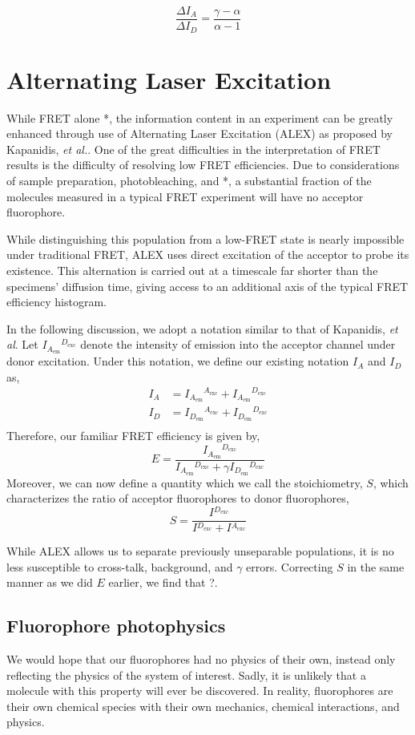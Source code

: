 \documentclass{article}
\newcommand{\emm}[1]{\ensuremath{_{#1_\mathrm{em}}}}   %
\newcommand{\exc}[1]{\ensuremath{^{#1_\mathrm{exc}}}}  %
\newcommand{\I}[2]{\ensuremath{I\emm{#1}\exc{#2}}}
\begin{document}
\begin{equation}
  \frac{\Delta I_A}{\Delta I_D} = \frac{\gamma - \alpha}{\alpha - 1}
\end{equation}

\section{Alternating Laser Excitation}
While FRET alone *, the information content in an experiment can be
greatly enhanced through use of Alternating Laser Excitation (ALEX) as
proposed by Kapanidis, {\it et al.}\cite{Kapanidis2005}. One of the
great difficulties in the interpretation of FRET results is the
difficulty of resolving low FRET efficiencies. Due to considerations
of sample preparation, photobleaching, and *, a substantial fraction
of the molecules measured in a typical FRET experiment will have no
acceptor fluorophore.

While distinguishing this population from a low-FRET state is nearly
impossible under traditional FRET, ALEX uses direct excitation of the
acceptor to probe its existence. This alternation is carried out at a
timescale far shorter than the specimens' diffusion time, giving
access to an additional axis of the typical FRET efficiency histogram.

In the following discussion, we adopt a notation similar to that of
Kapanidis, {\it et al}. Let \I{A}{D} denote the intensity of emission
into the acceptor channel under donor excitation. Under this notation,
we define our existing notation $I_A$ and $I_D$ as,
\begin{align*}
  I_A & = \I{A}{A} + \I{A}{D} \\
  I_D & = \I{D}{A} + \I{D}{D} \\
\end{align*}
Therefore, our familiar FRET efficiency is given by,
\[ E = \frac{\I{A}{D}}{\I{A}{D} + \gamma \I{D}{D}} \]
Moreover, we can now define a quantity which we call the
stoichiometry, $S$, which characterizes the ratio of acceptor
fluorophores to donor fluorophores,
\[ S = \frac{I\exc{D}}{I\exc{D} + I\exc{A}} \]

While ALEX allows us to separate previously unseparable populations,
it is no less susceptible to cross-talk, background, and $\gamma$
errors. Correcting $S$ in the same manner as we did $E$ earlier, we
find that ?.


\subsection{Fluorophore photophysics}
We would hope that our fluorophores had no physics of their own,
instead only reflecting the physics of the system of interest. Sadly,
it is unlikely that a molecule with this property will ever be
discovered. In reality, fluorophores are their own chemical species
with their own mechanics, chemical interactions, and physics. 
\end{document}
